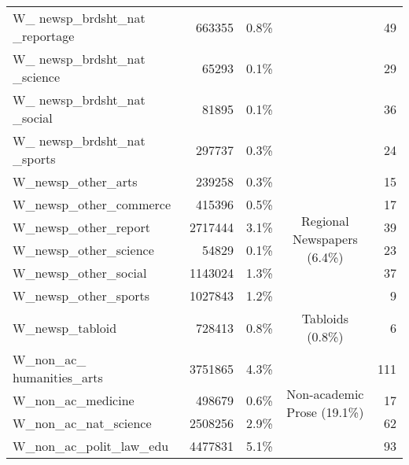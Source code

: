 {\begin{center}
\begin{tabular}{lrrcr}
        W\_ newsp\_brdsht\_nat \_reportage & 663355   & 0.8\%   &                                                         & 49    \\
        W\_ newsp\_brdsht\_nat \_science   & 65293    & 0.1\%   &                                                         & 29    \\
        W\_ newsp\_brdsht\_nat \_social    & 81895    & 0.1\%   &                                                         & 36    \\
        W\_ newsp\_brdsht\_nat \_sports    & 297737   & 0.3\%   &                                                         & 24    \\ \cline{4-4}
        W\_newsp\_other\_arts              & 239258   & 0.3\%   & \multirow{6}{*}{\parbox{2.1cm}{Regional Newspapers (6.4\%)}}    & 15    \\
        W\_newsp\_other\_commerce          & 415396   & 0.5\%   &                                                         & 17    \\
        W\_newsp\_other\_report            & 2717444  & 3.1\%   &                                                         & 39    \\
        W\_newsp\_other\_science           & 54829    & 0.1\%   &                                                         & 23    \\
        W\_newsp\_other\_social            & 1143024  & 1.3\%   &                                                         & 37    \\
        W\_newsp\_other\_sports            & 1027843  & 1.2\%   &                                                         & 9     \\ \cline{4-4}
        W\_newsp\_tabloid                  & 728413   & 0.8\%   & Tabloids (0.8\%)                                        & 6     \\ \cline{4-4}
        W\_non\_ac\_ humanities\_arts      & 3751865  & 4.3\%   & \multirow{6}{*}{\parbox{2.1cm}{Non-academic Prose (19.1\%)}}            & 111   \\
        W\_non\_ac\_medicine               & 498679   & 0.6\%   &                                                         & 17    \\
        W\_non\_ac\_nat\_science           & 2508256  & 2.9\%   &                                                         & 62    \\
        W\_non\_ac\_polit\_law\_edu        & 4477831  & 5.1\%   &                                                         & 93    \\

\end{tabular}
\end{center}}
